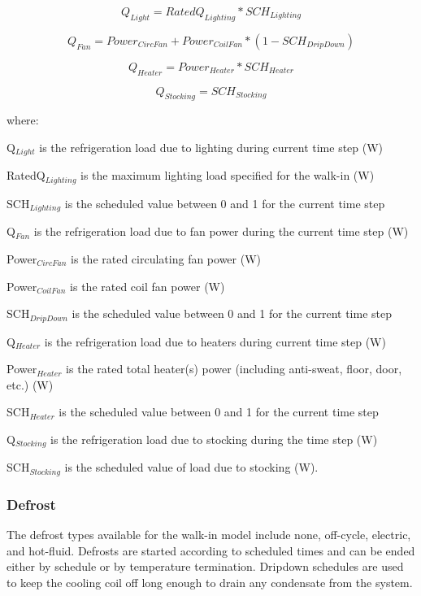 \begin{equation}
Q_{Light} = RatedQ_{Lighting} * SCH_{Lighting}
\end{equation}

\begin{equation}
Q_{Fan} = Power_{CircFan} + Power_{CoilFan} * ( 1 - SCH_{DripDown} )
\end{equation}

\begin{equation}
Q_{Heater} = Power_{Heater} * SCH_{Heater}
\end{equation}

\begin{equation}
Q_{Stocking} = SCH_{Stocking}
\end{equation}

where:

Q\(_{Light}\) is the refrigeration load due to lighting during current time step (W)

RatedQ\(_{Lighting}\) is the maximum lighting load specified for the walk-in (W)

SCH\(_{Lighting}\) is the scheduled value between 0 and 1 for the current time step

Q\(_{Fan}\) is the refrigeration load due to fan power during the current time step (W)

Power\(_{CircFan}\) is the rated circulating fan power (W)

Power\(_{CoilFan}\) is the rated coil fan power (W)

SCH\(_{DripDown}\) is the scheduled value between 0 and 1 for the current time step

Q\(_{Heater}\) is the refrigeration load due to heaters during current time step (W)

Power\(_{Heater}\) is the rated total heater(s) power (including anti-sweat, floor, door, etc.) (W)

SCH\(_{Heater}\) is the scheduled value between 0 and 1 for the current time step

Q\(_{Stocking}\) is the refrigeration load due to stocking during the time step (W)

SCH\(_{Stocking}\) is the scheduled value of load due to stocking (W).

\subsubsection{Defrost}\label{defrost}

The defrost types available for the walk-in model include none, off-cycle, electric, and hot-fluid. Defrosts are started according to scheduled times and can be ended either by schedule or by temperature termination. Dripdown schedules are used to keep the cooling coil off long enough to drain any condensate from the system.

